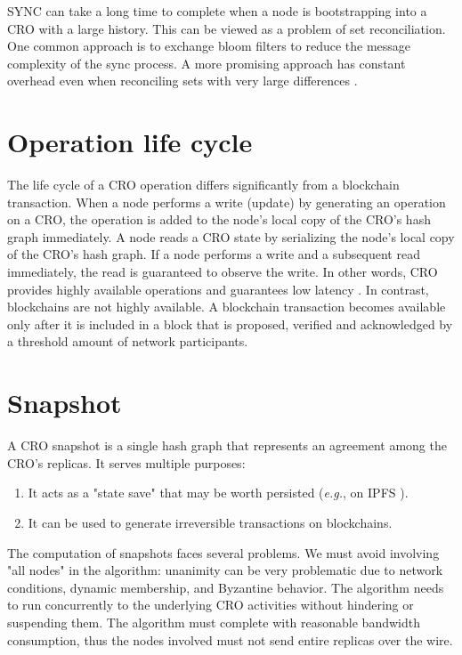\documentclass{article}
\begin{document}
SYNC can take a long time to complete when a node is bootstrapping into a CRO with a large history. This can be viewed as a problem of set reconciliation. One common approach is to exchange bloom filters to reduce the message complexity of the sync process. A more promising approach has constant overhead even when reconciling sets with very large differences \cite{PRIBLT}.

\section{Operation life cycle}
\label{sec:headings}

The life cycle of a CRO operation differs significantly from a blockchain transaction. When a node performs a write (update) by generating an operation on a CRO, the operation is added to the node's local copy of the CRO's hash graph immediately. A node reads a CRO state by serializing the node's local copy of the CRO's hash graph. If a node performs a write and a subsequent read immediately, the read is guaranteed to observe the write. In other words, CRO provides highly available operations and guarantees low latency \cite{HAT}. In contrast, blockchains are not highly available. A blockchain transaction becomes available only after it is included in a block that is proposed, verified and acknowledged by a threshold amount of network participants.

\section{Snapshot}
\label{sec:headings}

A CRO snapshot is a single hash graph that represents an agreement among the CRO's replicas. It serves multiple purposes:
\begin{enumerate}
    \item It acts as a "state save" that may be worth persisted (\textit{e.g.}, on IPFS \cite{IPFS}).
    \item It can be used to generate irreversible transactions on blockchains.
\end{enumerate}

The computation of snapshots faces several problems. We must avoid involving "all nodes" in the algorithm: unanimity can be very problematic due to network conditions, dynamic membership, and Byzantine behavior. The algorithm needs to run concurrently to the underlying CRO activities without hindering or suspending them. The algorithm must complete with reasonable bandwidth consumption, thus the nodes involved must not send entire replicas over the wire.
\end{document}
